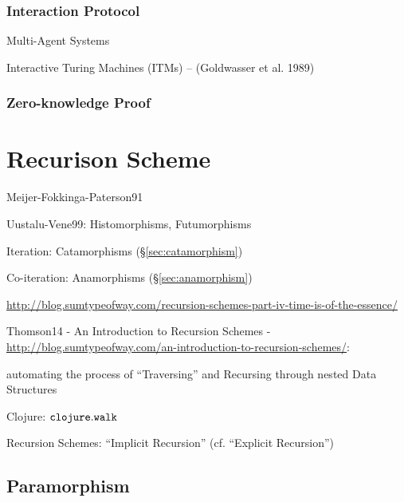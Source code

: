 \subsubsection{Interaction Protocol}\label{sec:interactive_protocol}

Multi-Agent Systems

Interactive Turing Machines (ITMs) -- (Goldwasser et al. 1989)



\subsubsection{Zero-knowledge Proof}\label{sec:zero_knowledge_proof}



\section{Recurison Scheme}\label{sec:recursion_scheme}

Meijer-Fokkinga-Paterson91 %

Uustalu-Vene99: Histomorphisms, Futumorphisms

Iteration: Catamorphisms (\S\ref{sec:catamorphism})

Co-iteration: Anamorphisms (\S\ref{sec:anamorphism})

\url{http://blog.sumtypeofway.com/recursion-schemes-part-iv-time-is-of-the-essence/}

Thomson14 - An Introduction to Recursion Schemes -
\url{http://blog.sumtypeofway.com/an-introduction-to-recursion-schemes/}:

automating the process of ``Traversing'' and Recursing through nested
Data Structures

Clojure: $\mathtt{clojure.walk}$

Recursion Schemes: ``Implicit Recursion'' (cf. ``Explicit Recursion'')



\subsection{Paramorphism}\label{sec:paramorphism}

